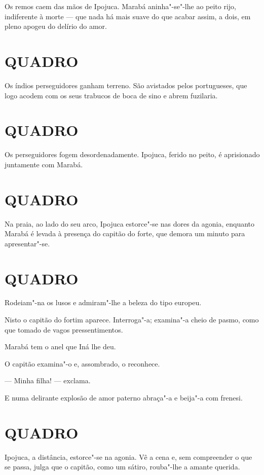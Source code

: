 Os remos caem das mãos de Ipojuca. Marabá aninha"-se"-lhe ao peito rijo,
indiferente à morte --- que nada há mais suave do que acabar assim, a
dois, em pleno apogeu do delírio do amor.

\section*{QUADRO}

Os índios perseguidores ganham terreno. São avistados pelos portugueses,
que logo acodem com os seus trabucos de boca de sino e abrem fuzilaria.

\section*{QUADRO}

Os perseguidores fogem desordenadamente. Ipojuca, ferido no peito, é
aprisionado juntamente com Marabá.

\section*{QUADRO}

Na praia, ao lado do seu arco, Ipojuca estorce"-se nas dores da agonia,
enquanto Marabá é levada à presença do capitão do forte, que demora um
minuto para apresentar"-se.

\section*{QUADRO}

Rodeiam"-na os lusos e admiram"-lhe a beleza do tipo europeu.

Nisto o capitão do fortim aparece. Interroga"-a; examina"-a cheio de
pasmo, como que tomado de vagos pressentimentos.

Marabá tem o anel que Iná lhe deu.

O capitão examina"-o e, assombrado, o reconhece.

--- Minha filha! --- exclama.

E numa delirante explosão de amor paterno abraça"-a e beija"-a com
frenesi.

\section*{QUADRO}

Ipojuca, a distância, estorce"-se na agonia. Vê a cena e, sem compreender
o que se passa, julga que o capitão, como um sátiro, rouba"-lhe a amante
querida.

